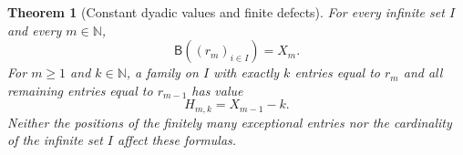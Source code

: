 \documentclass[11pt,letterpaper]{article}
\newtheorem{theorem}{Theorem}[section]
\theoremstyle{definition}
\theoremstyle{remark}
\newcommand{\NN}{\mathbb N}
\newcommand{\BB}{\mathsf B}
\begin{document}
\begin{theorem}[Constant dyadic values and finite defects]\label{thm:constants}
For every infinite set $I$ and every $m\in\NN$,
\begin{equation}\label{eq:constant-value}
                              \BB((r_m)_{i\in I})=X_m.
\end{equation}
For $m\geq1$ and $k\in\NN$, a family on $I$ with exactly $k$ entries equal to
$r_m$ and all remaining entries equal to $r_{m-1}$ has value
\begin{equation}\label{eq:defect-value}
                              H_{m,k}=X_{m-1}-k.
\end{equation}
Neither the positions of the finitely many exceptional entries nor the
cardinality of the infinite set $I$ affect these formulas.
\end{theorem}
\end{document}
